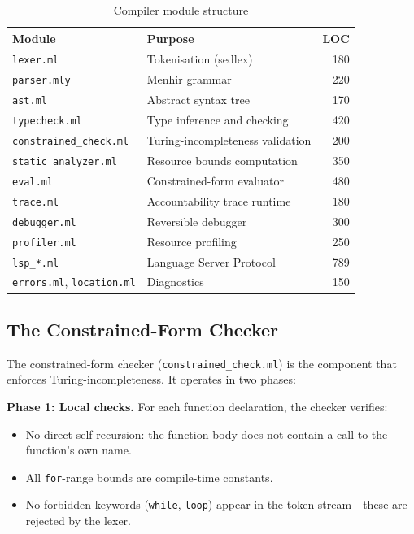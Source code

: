 \documentclass[11pt,a4paper]{article}
\begin{document}
\begin{table}[htbp]
\centering
\caption{Compiler module structure}
\label{tab:modules}
\begin{tabular}{@{}llr@{}}
\toprule
\textbf{Module} & \textbf{Purpose} & \textbf{LOC} \\
\midrule
\texttt{lexer.ml} & Tokenisation (sedlex) & 180 \\
\texttt{parser.mly} & Menhir grammar & 220 \\
\texttt{ast.ml} & Abstract syntax tree & 170 \\
\texttt{typecheck.ml} & Type inference and checking & 420 \\
\texttt{constrained\_check.ml} & Turing-incompleteness validation & 200 \\
\texttt{static\_analyzer.ml} & Resource bounds computation & 350 \\
\texttt{eval.ml} & Constrained-form evaluator & 480 \\
\texttt{trace.ml} & Accountability trace runtime & 180 \\
\texttt{debugger.ml} & Reversible debugger & 300 \\
\texttt{profiler.ml} & Resource profiling & 250 \\
\texttt{lsp\_*.ml} & Language Server Protocol & 789 \\
\texttt{errors.ml}, \texttt{location.ml} & Diagnostics & 150 \\
\bottomrule
\end{tabular}
\end{table}

\subsection{The Constrained-Form Checker}

The constrained-form checker (\texttt{constrained\_check.ml}) is the
component that enforces Turing-incompleteness.  It operates in two phases:

\textbf{Phase 1: Local checks.}  For each function declaration, the checker
verifies:
\begin{itemize}[nosep]
  \item No direct self-recursion: the function body does not contain a call
    to the function's own name.
  \item All \texttt{for}-range bounds are compile-time constants.
  \item No forbidden keywords (\texttt{while}, \texttt{loop}) appear in the
    token stream---these are rejected by the lexer.
\end{itemize}
\end{document}
